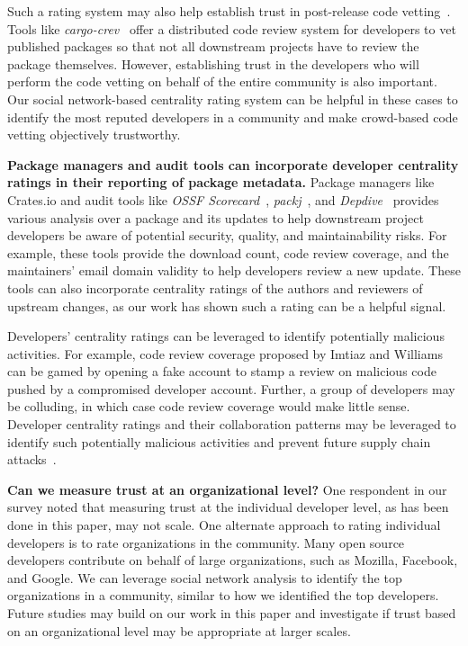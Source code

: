 \documentclass[10pt,journal,compsoc]{IEEEtran}
\begin{document}
Such a rating system may also help establish trust in post-release code vetting~\cite{zimmermann2019small, imtiaz2022phantom}. Tools like \textit{cargo-crev}~\cite{cargocrev} offer a distributed code review system for developers to vet published packages so that not all downstream projects have to review the package themselves. However, establishing trust in the developers who will perform the code vetting on behalf of the entire community
is also important. Our social network-based centrality rating system can be helpful in these cases to identify the most reputed developers in a community and make crowd-based code vetting objectively trustworthy.  

\textbf{Package managers and audit tools can incorporate developer centrality ratings in their reporting of package metadata.} Package managers like Crates.io and audit tools like \textit{OSSF Scorecard}~\cite{ossfscorecard}, \textit{packj}~\cite{packj}, and \textit{Depdive}~\cite{imtiaz2022phantom} provides various analysis over a package and its updates to help downstream project developers be aware of potential security, quality, and maintainability risks. For example, these tools provide the download count, code review coverage, and the maintainers' email domain validity to help developers review a new update. These tools can also incorporate centrality ratings of the authors and reviewers of upstream changes, as our work has shown such a rating can be a helpful signal.

Developers' centrality ratings can be leveraged to identify potentially malicious activities. For example, code review coverage proposed by Imtiaz and Williams~\cite{imtiaz2022phantom} can be gamed by opening a fake account to stamp a review on malicious code pushed by a compromised developer account. Further, a group of developers may be colluding, in which case code review coverage would make little sense. Developer centrality ratings and their collaboration patterns may be leveraged to identify such potentially malicious activities and prevent future supply chain attacks~\cite{ohm2020backstabber}.



\textbf{Can we measure trust at an organizational level?} One respondent in our survey noted that measuring trust at the individual developer level, as has been done in this paper, may not scale. One alternate approach to rating individual developers is to rate organizations in the community. Many open source developers contribute on behalf of large organizations, such as Mozilla, Facebook, and Google. We can leverage social network analysis to identify the top organizations in a community, similar to how we identified the top developers. 
Future studies may build on our work in this paper and investigate if trust based on an organizational level may be appropriate at larger scales.
\end{document}

